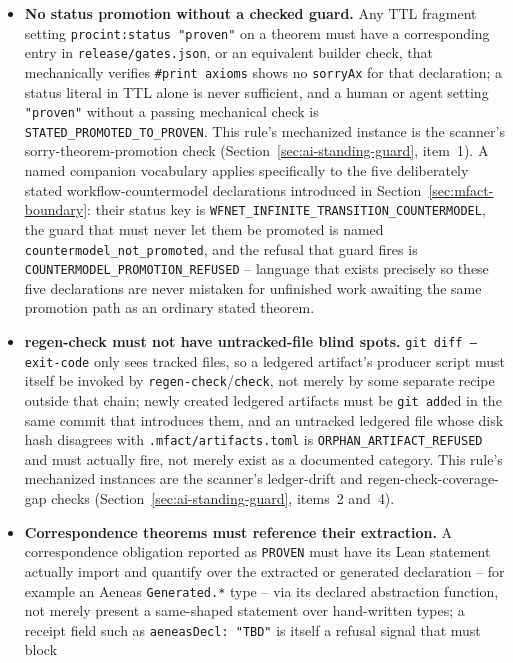 \begin{itemize}
\item \textbf{No status promotion without a checked guard.} Any TTL
  fragment setting \texttt{procint:status "proven"} on a theorem must
  have a corresponding entry in \texttt{release/gates.json}, or an
  equivalent builder check, that mechanically verifies \texttt{\#print
  axioms} shows no \texttt{sorryAx} for that declaration; a status
  literal in TTL alone is never sufficient, and a human or agent setting
  \texttt{"proven"} without a passing mechanical check is
  \texttt{STATED\_PROMOTED\_TO\_PROVEN}. This rule's mechanized instance
  is the scanner's sorry-theorem-promotion check
  (Section~\ref{sec:ai-standing-guard}, item~1). A named companion
  vocabulary applies specifically to the five deliberately stated
  workflow-countermodel declarations introduced in
  Section~\ref{sec:mfact-boundary}: their status key is
  \texttt{WFNET\_INFINITE\_TRANSITION\_COUNTERMODEL}, the guard that must
  never let them be promoted is named \texttt{countermodel\_not\_promoted},
  and the refusal that guard fires is \texttt{COUNTERMODEL\_PROMOTION\_REFUSED}
  -- language that exists precisely so these five declarations are never
  mistaken for unfinished work awaiting the same promotion path as an
  ordinary stated theorem.
\item \textbf{regen-check must not have untracked-file blind spots.}
  \texttt{git diff --exit-code} only sees tracked files, so a ledgered
  artifact's producer script must itself be invoked by
  \texttt{regen-check}/\texttt{check}, not merely by some separate recipe
  outside that chain; newly created ledgered artifacts must be
  \texttt{git add}ed in the same commit that introduces them, and an
  untracked ledgered file whose disk hash disagrees with
  \texttt{.mfact/artifacts.toml} is \texttt{ORPHAN\_ARTIFACT\_REFUSED} and
  must actually fire, not merely exist as a documented category. This
  rule's mechanized instances are the scanner's ledger-drift and
  regen-check-coverage-gap checks (Section~\ref{sec:ai-standing-guard},
  items~2 and~4).
\item \textbf{Correspondence theorems must reference their extraction.}
  A correspondence obligation reported as \texttt{PROVEN} must have its
  Lean statement actually import and quantify over the extracted or
  generated declaration -- for example an Aeneas \texttt{Generated.*}
  type -- via its declared abstraction function, not merely present a
  same-shaped statement over hand-written types; a receipt field such as
  \texttt{aeneasDecl: "TBD"} is itself a refusal signal that must block

\end{itemize}
